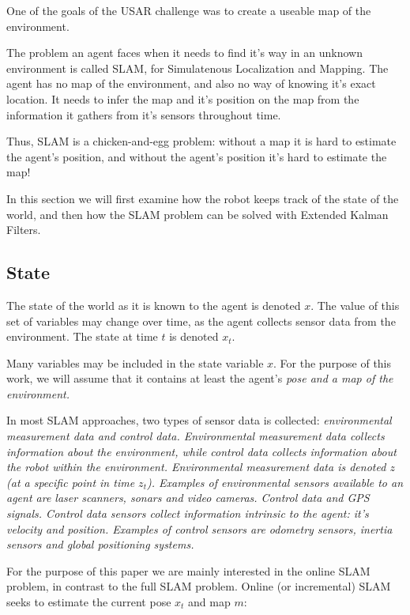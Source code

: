 One of the goals of the USAR challenge was to create a useable map of the environment. 

The problem an agent faces when it needs to find it's way in an unknown environment is called SLAM, for Simulatenous Localization and Mapping. The agent has no map of the environment, and also no way of knowing it's exact location. It needs to infer the map and it's position on the map from the information it gathers from it's sensors throughout time.

Thus, SLAM is a chicken-and-egg problem: without a map it is hard to estimate the agent's position, and without the agent's position it's hard to estimate the map!

In this section we will first examine how the robot keeps track of the state of the world, and then how the SLAM problem can be solved with Extended Kalman Filters. 

\subsection{State}
\label{slam:state}
The state of the world as it is known to the agent is denoted $x$. The value of this set of variables may change over time, as the agent collects sensor data from the environment. The state at time $t$ is denoted $x_{t}$. 

Many variables may be included in the state variable $x$. For the purpose of this work, we will assume that it contains at least the agent's \em{pose} and a \em{map of the environment}. 

In most SLAM approaches, two types of sensor data is collected: \em{environmental measurement data} and \em{control data}. Environmental measurement data collects information about the environment, while control data collects information about the robot within the environment. Environmental measurement data  is denoted $z$ (at a specific point in time $z_{t}$). Examples of environmental sensors available to an agent are laser scanners, sonars and video cameras. Control data and GPS signals. Control data sensors collect information intrinsic to the agent: it's velocity and position. Examples of control sensors are odometry sensors, inertia sensors and global positioning systems.

For the purpose of this paper we are mainly interested in the online SLAM problem, in contrast to the full SLAM problem. Online (or incremental) SLAM seeks to estimate the current pose $x_{t}$ and map $m$:

